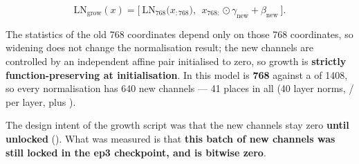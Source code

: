 \documentclass[11pt,openany]{article}
\begin{document}
\[
\mathrm{LN}_{\text{grow}}(x)=\Big[\ \mathrm{LN}_{768}\big(x_{:768}\big),\ \ x_{768:}\odot\gamma_{\text{new}}+\beta_{\text{new}}\ \Big].
\]

The statistics of the old 768 coordinates depend only on those 768 coordinates, so widening does
not change the normalisation result; the new channels are controlled by an independent affine
pair initialised to zero, so growth is \textbf{strictly function-preserving at initialisation}.
In this model \linebreak[0] is \textbf{768} against a  of 1408, so every
normalisation has 640 new channels --- 41 places in all (40 layer norms,
/ per layer, plus ).

The design intent of the growth script was that the new channels stay zero \textbf{until
unlocked} (\linebreak[0]\linebreak[0]\linebreak[0]\linebreak[0]). What was measured is that
\textbf{this batch of new channels was still locked in the ep3 checkpoint, and is bitwise zero}.
\end{document}
